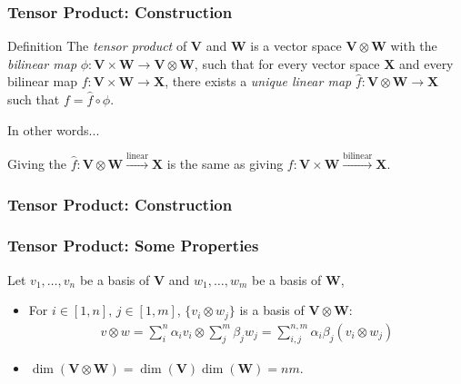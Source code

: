 \documentclass{beamer}
\theoremstyle{definition}
\newcommand{\V}{\mathbf{V}}
\newcommand{\W}{\mathbf{W}}
\newcommand{\X}{\mathbf{X}}
\newcommand{\lin}{\overset{\text{linear}}{\longrightarrow}}
\begin{document}
\begin{frame}


\frametitle{Tensor Product: Construction}	
\begin{block}{Definition}
The \textit{tensor product} of $\V$ and $\W$ is a vector space $\V \otimes \W$ with the \textit{bilinear map} $\phi : \V\times \W \longrightarrow \V\otimes \W$, such that for every vector space $\X$ and every bilinear map $f : \V \times \W \longrightarrow \X$, there exists a \textit{unique linear map} $\hat{f} : \V\otimes \W \longrightarrow \X$ such that $f = \hat{f} \circ \phi$.
\end{block}


\begin{block}{In other words...}

Giving the $\hat{f} : \V\otimes \W \lin \X$ is the same as giving $f : \V\times \W \stackrel{\text{bilinear}}{\longrightarrow} \X$.


\end{block}




\end{frame}


\begin{frame}[fragile]
\frametitle{Tensor Product: Construction}
\centering
\begin{center}
\end{center}
\end{frame}








\begin{frame}
\frametitle{Tensor Product: Some Properties}
Let $v_1,\dots,v_n$ be a basis of $\V$ and $w_1,\dots,w_m$ be a basis of $\W$,
\begin{itemize}
	\item For $i\in [1,n],\, j \in [1,m]$, 
	$\{ v_i \otimes w_j\}$ is a basis of $\V\otimes \W$:
	\begin{align*}
	v\otimes w = \sum^n_i \alpha_i v_i \otimes \sum^m_j \beta_j w_j =  \sum^{n,m}_{i,j}\alpha_i\beta_j(v_i \otimes w_j)
	\end{align*}
	\item $\dim(\V\otimes \W) = \dim(\V)\dim(\W) = nm$.
\end{itemize}







\end{frame}
\end{document}
